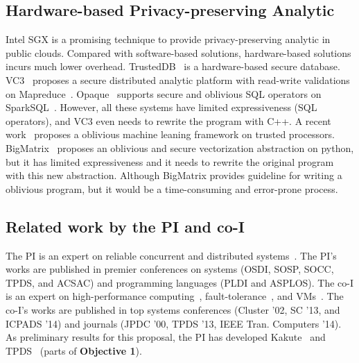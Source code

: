 \subsection{Hardware-based Privacy-preserving Analytic}
Intel SGX is a promising technique to provide privacy-preserving analytic
in public clouds. Compared with software-based solutions, hardware-based 
solutions
incurs much lower overhead. TrustedDB~\cite{trusteddb:sigmod11} is a
hardware-based secure database.
VC3~\cite{vc3:sp15} proposes a secure distributed analytic platform
with read-write validations on Mapreduce~\cite{mapreduce}. 
Opaque~\cite{opaque:nsdi17}
supports secure and oblivious SQL operators on 
SparkSQL~\cite{sparksql:sigmod15}.
However, all these systems have limited expressiveness (\eg SQL operators), and
VC3 even needs to rewrite the program with C++. A recent 
work~\cite{oblivious:security16} proposes a oblivious machine leaning
framework on trusted processors.
BigMatrix~\cite{bigmatrix:ccs17} proposes an oblivious and secure vectorization
abstraction on python, but it has limited expressiveness and it needs to
rewrite the original program with this new abstraction.
Although BigMatrix provides guideline for
writing a oblivious program, but it would be a time-consuming and error-prone
process.

\vspace{-.15in}\subsection{Related work by the PI and co-I} 
\label{sec:my-work}\vspace{-.075in}
% 

The PI is an expert on reliable concurrent and distributed 
systems~\cite{smt:cacm, cui:tern:osdi10, peregrine:sosp11,
parrot:sosp13, crane:sosp15, tripod:apsys16}. The 
PI's works are published in premier conferences on systems (OSDI, SOSP, SOCC, 
TPDS, and ACSAC) and programming languages (PLDI and ASPLOS). The co-I is an 
expert on high-performance 
computing~\cite{powerrock,hwang,jessica,cheung,khokhar}, fault-tolerance~\cite{ 
sheng,shengdi1}, and VMs~\cite{rhymes,shengdi,jessica2}. The 
co-I's works are published in top systems conferences (Cluster '02, SC '13, 
and ICPADS '14) and journals (JPDC '00, TPDS '13, IEEE Tran. Computers '14). As 
preliminary results for this \xxx proposal, the PI has 
developed Kakute~\cite{kakute:acsac17} and TPDS~\cite{confluence:tpds17} (parts 
of \textbf{Objective 1}). 


